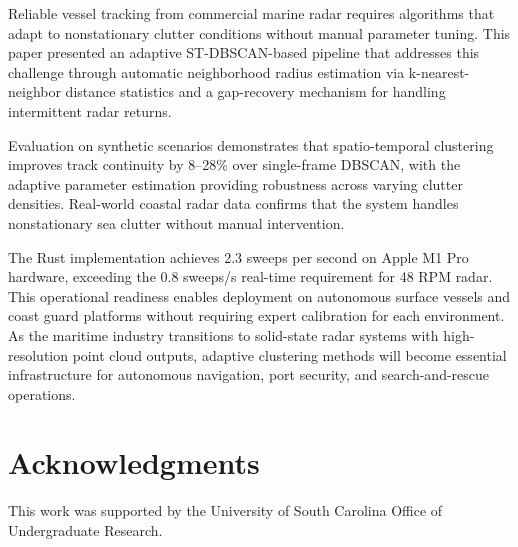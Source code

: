 \documentclass[conf]{new-aiaa}
\begin{document}
Reliable vessel tracking from commercial marine radar requires algorithms that adapt to nonstationary clutter conditions without manual parameter tuning. This paper presented an adaptive ST-DBSCAN-based pipeline that addresses this challenge through automatic neighborhood radius estimation via k-nearest-neighbor distance statistics and a gap-recovery mechanism for handling intermittent radar returns.

Evaluation on synthetic scenarios demonstrates that spatio-temporal clustering improves track continuity by 8--28\% over single-frame DBSCAN, with the adaptive parameter estimation providing robustness across varying clutter densities. Real-world coastal radar data confirms that the system handles nonstationary sea clutter without manual intervention.

The Rust implementation achieves 2.3 sweeps per second on Apple M1 Pro hardware, exceeding the 0.8 sweeps/s real-time requirement for 48 RPM radar. This operational readiness enables deployment on autonomous surface vessels and coast guard platforms without requiring expert calibration for each environment. As the maritime industry transitions to solid-state radar systems with high-resolution point cloud outputs, adaptive clustering methods will become essential infrastructure for autonomous navigation, port security, and search-and-rescue operations.

\section*{Acknowledgments}

This work was supported by the University of South Carolina Office of Undergraduate Research.
\end{document}
